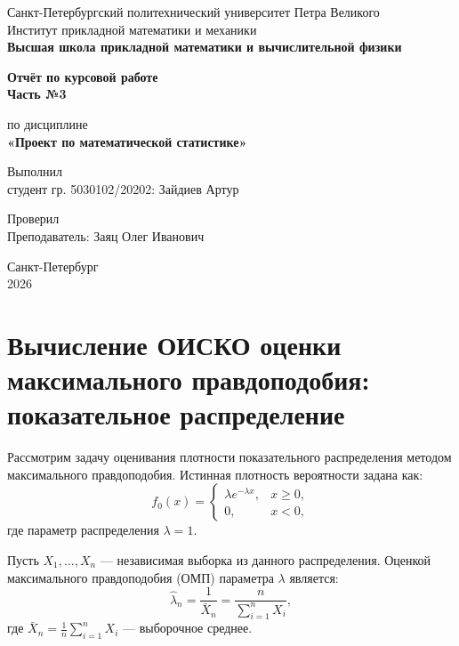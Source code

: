 \documentclass[12pt,a4paper]{article}
\begin{document}

\begin{titlepage}
  \begin{center}
    {Санкт-Петербургский политехнический университет Петра Великого\\
    Институт прикладной математики и механики\\[0.5em]
    \textbf{Высшая школа прикладной математики и вычислительной физики}}

    \vfill

    {\LARGE\bfseries Отчёт по курсовой работе\\ Часть №3\par}
    \vspace{1em}
    {\Large по дисциплине\\[0.3em] {\bfseries «Проект по математической статистике»}}

    \vfill

    \begin{flushright}
        Выполнил\\
        студент гр. 5030102/20202: Зайдиев Артур
    \end{flushright}

    \begin{flushright}
        Проверил\\
        Преподаватель: Заяц Олег Иванович
    \end{flushright}

    \vfill
    Санкт-Петербург\\
    2026
  \end{center}
\end{titlepage}

\setcounter{page}{2}
\newpage

\section*{Вычисление ОИСКО оценки максимального правдоподобия: показательное распределение}

Рассмотрим задачу оценивания плотности показательного распределения методом максимального правдоподобия. Истинная плотность вероятности задана как:
\[
f_0(x) =
\begin{cases}
\lambda e^{-\lambda x}, & x \ge 0, \\
0, & x < 0,
\end{cases}
\]
где параметр распределения $\lambda = 1$.

Пусть $X_1, \dots, X_n$ — независимая выборка из данного распределения. Оценкой максимального правдоподобия (ОМП) параметра $\lambda$ является:
\[
\hat{\lambda}_n = \frac{1}{\bar{X}_n} = \frac{n}{\sum_{i=1}^n X_i},
\]
где $\bar{X}_n = \frac{1}{n}\sum_{i=1}^n X_i$ — выборочное среднее.
\end{document}
